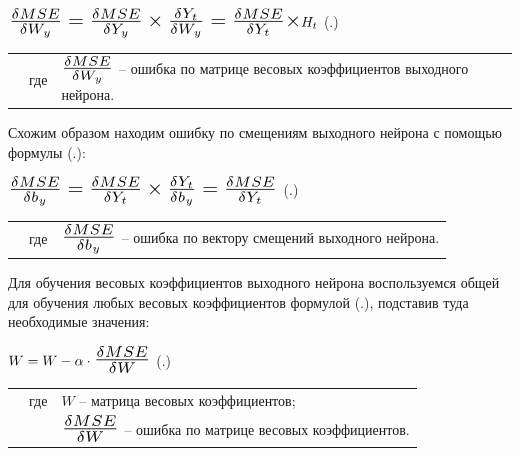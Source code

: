 {  \formulaspace \par \redline 
    $\scaleto{\frac{\delta MSE}{\delta W_y} = \frac{\delta MSE}{\delta Y_y} \times \frac{\delta Y_t}{\delta W_y} = \frac{\delta MSE}{\delta Y_t} \times }{21pt} H_t$
    \hfill (\thechaptercntr .\theformulacntr) \redline
  \formulaspace \addtocounter{formulacntr}{1}

  \begin{tabular}{p{}p{}p{}}
		& где  & $\scaleto{\frac{\delta MSE}{\delta W_y}}{20pt}$ {--} ошибка по матрице весовых коэффициентов выходного нейрона. \\
  \end{tabular}

  \par \redline Схожим образом находим ошибку по смещениям выходного нейрона с помощью формулы (\thechaptercntr .\theformulacntr):

  \formulaspace \par \redline 
    $\scaleto{\frac{\delta MSE}{\delta b_y} = \frac{\delta MSE}{\delta Y_t} \times \frac{\delta Y_t}{\delta b_y} = \frac{\delta MSE}{\delta Y_t}}{21pt}$
    \hfill (\thechaptercntr .\theformulacntr) \redline
  \formulaspace \addtocounter{formulacntr}{1}

  \begin{tabular}{p{}p{}p{}}
		& где  & $\scaleto{\frac{\delta MSE}{\delta b_y}}{21pt}$ {--} ошибка по вектору смещений выходного нейрона. \\
  \end{tabular}

  \par \redline Для обучения весовых коэффициентов выходного нейрона воспользуемся общей для обучения любых весовых коэффициентов формулой (\thechaptercntr .\theformulacntr), подставив туда необходимые значения:

  \formulaspace \par \redline 
    $W = W - \alpha \cdot \scaleto{\frac{\delta MSE}{\delta W}}{19pt}$
    \hfill (\thechaptercntr .\theformulacntr) \redline
  \formulaspace \addtocounter{formulacntr}{1}

  \begin{tabular}{p{}p{}p{}}
		& где  & $W$ {--} матрица весовых коэффициентов; \\
    &      & $\scaleto{\frac{\delta MSE}{\delta W}}{19pt}$ {--} ошибка по матрице весовых коэффициентов. \\
  \end{tabular}

}
